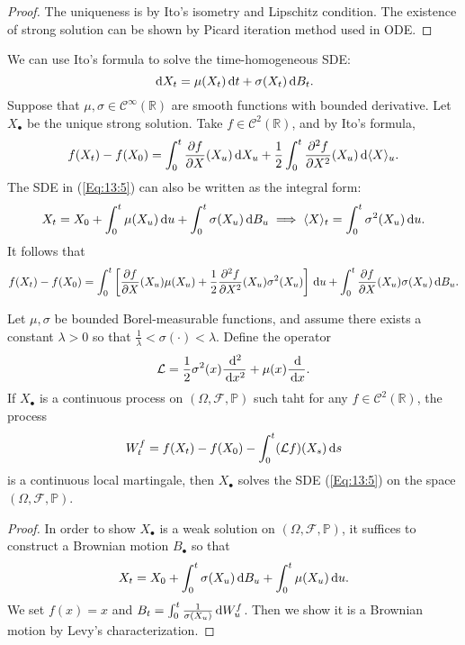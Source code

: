 \begin{proof}
The uniqueness is by Ito's isometry and Lipschitz condition.
The existence of strong solution can be shown by Picard iteration method used in ODE.
\end{proof}

We can use Ito's formula to solve the time-homogeneous SDE:
\begin{equation}\label{Eq:13:5}
\diff X_t = \mu(X_t)\diff t + \sigma(X_t)\diff B_t.
\end{equation}
Suppose that $\mu,\sigma\in\mathcal{C}^\infty(\mathbb{R})$ are smooth functions with bounded derivative.
Let $X_{\bullet}$ be the unique strong solution.
Take $f\in\mathcal{C}^2(\mathbb{R})$, and by Ito's formula,
\[
f(X_t) - f(X_0) = \int_0^t\frac{\partial f}{\partial X}(X_u)\,\mathrm{d} X_u + \frac{1}{2}\int_0^t\frac{\partial^2 f}{\partial X^2}(X_u)\,\mathrm{d}\langle X\rangle_u.
\]
The SDE in (\eqref{Eq:13:5}) can also be written as the integral form:
\[
X_t = X_0 + \int_0^t\mu(X_u)\,\mathrm{d} u + \int_0^t\sigma(X_u)\,\mathrm{d} B_u\implies
\langle X\rangle_t = \int_0^t\sigma^2(X_u)\,\mathrm{d} u.
\]
It follows that
\[
f(X_t) - f(X_0) = \int_0^t\left[
\frac{\partial f}{\partial X}(X_u)\mu(X_u) + \frac{1}{2}\frac{\partial^2 f}{\partial X^2}(X_u)\sigma^2(X_u)
\right]\,\mathrm{d} u + \int_0^t \frac{\partial f}{\partial X}(X_u)\sigma(X_u)\,\mathrm{d} B_u.
\]

\begin{theorem}
Let $\mu,\sigma$ be bounded Borel-measurable functions, and assume there exists a constant $\lambda>0$ so that $\frac{1}{\lambda}<\sigma(\cdot)<\lambda$.
Define the operator 
\[
\mathcal{L}=\frac{1}{2}\sigma^2(x)\frac{\,\mathrm{d}^2}{\,\mathrm{d} x^2} + \mu(x)\frac{\,\mathrm{d}}{\,\mathrm{d} x}.
\]
If $X_{\bullet}$ is a continuous process on $(\Omega,\mathcal{F},\mathbb{P})$ such taht for any $f\in\mathcal{C}^2(\mathbb{R})$, the process
\[
W_t^f = f(X_t) - f(X_0) - \int_0^t(\mathcal{L}f)(X_s)\,\mathrm{d} s
\]
is a continuous local martingale, then $X_{\bullet}$ solves the SDE (\eqref{Eq:13:5}) on the space $(\Omega,\mathcal{F},\mathbb{P})$.
\end{theorem}
\begin{proof}
In order to show $X_{\bullet}$ is a weak solution on $(\Omega,\mathcal{F},\mathbb{P})$, it suffices to construct a Brownian motion $B_{\bullet}$ so that 
\[
X_t= X_0 + \int_0^t\sigma(X_u)\,\mathrm{d} B_u + \int_0^t\mu(X_u)\,\mathrm{d} u.
\]
We set $f(x)=x$ and $B_t = \int_0^t\frac{1}{\sigma(X_u)}\,\mathrm{d} W_u^f$.
Then we show it is a Brownian motion by Levy's characterization.
\end{proof}

















